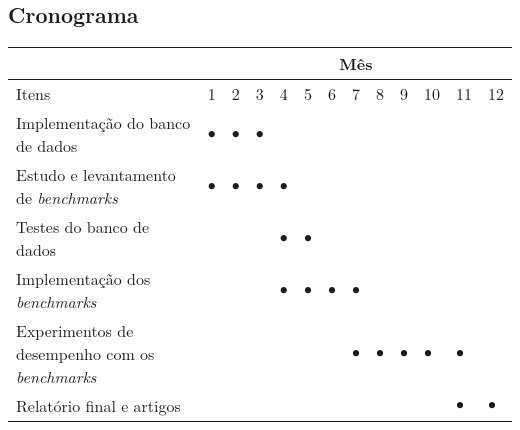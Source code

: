 \documentclass[a4paper,12pt]{article}
\newcommand{\benchmarks}{\emph{benchmarks}}
\begin{document}
\subsection{Cronograma}

\begin{center}
\begin{footnotesize}
\begin{tabular}{||l||p{0.2cm}|p{0.2cm}|p{0.2cm}|p{0.2cm}|p{0.2cm}|p{0.2cm}|p{0.2cm}|p{0.2cm}|p{0.2cm}|p{0.2cm}|p{0.2cm}|p{0.24cm}||}
  \hline
  \hline
                        & \multicolumn{12}{|c||}{M\^es}\\
  \hline
  \hline
  Itens &1 &2 &3 &4 &5 &6 &7 &8 &9 &10&11&12\\
  \hline

  Implementação do banco de dados &$\bullet$&$\bullet$&$\bullet$&         &         &         &         &         &         &         &          &         \\
  \hline

  Estudo e levantamento de \benchmarks           &$\bullet$&$\bullet$&$\bullet$&$\bullet$&         &         &         &         &         &         &          &         \\
  \hline

  Testes do banco de dados        &         &         &         &$\bullet$&$\bullet$&         &         &         &         &         &          &         \\
  \hline

  Implementação dos \benchmarks   &         &         &         &$\bullet$&$\bullet$&$\bullet$&$\bullet$&         &         &         &          &         \\
  \hline

  Experimentos de desempenho com os \benchmarks          &         &         &         &         &         &         &$\bullet$&$\bullet$&$\bullet$& $\bullet$&$\bullet$&   \\
  \hline
  
  Relatório final e artigos                      &         &         &         &         &         &         &         &         &         &         &$\bullet$&$\bullet$\\
  \hline

  \hline
\end{tabular}
\label{tab:cronograma}  
\end{footnotesize}
\end{center}

\linespread{1.0}
\begin{small}


%
\end{small}
\end{document}
